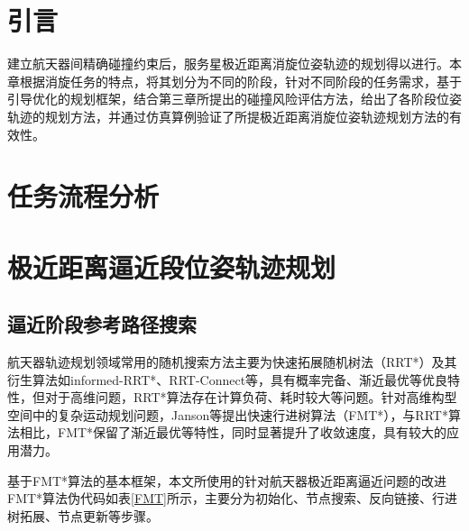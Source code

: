 \documentclass[lang=chs, degree=master, blindreview=false, winfonts=true]{yanputhesis}
\begin{document}
\section{引言}
建立航天器间精确碰撞约束后，服务星极近距离消旋位姿轨迹的规划得以进行。本章根据消旋任务的特点，将其划分为不同的阶段，针对不同阶段的任务需求，基于引导优化的规划框架，结合第三章所提出的碰撞风险评估方法，给出了各阶段位姿轨迹的规划方法，并通过仿真算例验证了所提极近距离消旋位姿轨迹规划方法的有效性。

\section{任务流程分析}




\section{极近距离逼近段位姿轨迹规划}
\subsection{逼近阶段参考路径搜索}
航天器轨迹规划领域常用的随机搜索方法主要为快速拓展随机树法（RRT*）及其衍生算法如informed-RRT*、RRT-Connect等，具有概率完备、渐近最优等优良特性，但对于高维问题，RRT*算法存在计算负荷、耗时较大等问题。针对高维构型空间中的复杂运动规划问题，Janson等提出快速行进树算法（FMT*）\cite{jansonFastMarchingTree2015}，与RRT*算法相比，FMT*保留了渐近最优等特性，同时显著提升了收敛速度，具有较大的应用潜力。

基于FMT*算法的基本框架，本文所使用的针对航天器极近距离逼近问题的改进FMT*算法伪代码如表\ref{FMT}所示，主要分为初始化、节点搜索、反向链接、行进树拓展、节点更新等步骤。
\end{document}
